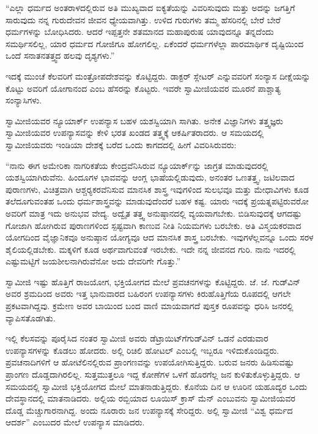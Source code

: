  “ಎಲ್ಲಾ ಧರ್ಮದ ಅಂತರಾಳದಲ್ಲಿರುವ ಅತಿ ಮುಖ್ಯವಾದ ಐಕ್ಯತೆಯನ್ನು ವಿವರಿಸುವುದು ಮತ್ತು ಅದನ್ನು ಜಗತ್ತಿಗೆ ಸಾರುವುದು ನನ್ನ ಗುರುದೇವನ ಜೀವನ ಧ್ಯೇಯವಾಗಿತ್ತು. ಉಳಿದ ಗುರುಗಳು ತಮ್ಮ ಹೆಸರಿನಲ್ಲಿ ಬೇರೆ ಬೇರೆ ಧರ್ಮಗಳನ್ನು ಬೋಧಿಸಿದರು. ಆದರೆ ಇಪ್ಪತ್ತನೇ ಶತಮಾನದ ಮಹಾಪುರುಷ ಯಾವುದನ್ನೂ ತನ್ನದೆಂದು ಸಮರ್ಥಿಸಲಿಲ್ಲ, ಯಾರ ಧರ್ಮದ ಗೋಜಿಗೂ ಹೋಗಲಿಲ್ಲ. ಏಕೆಂದರೆ ಧರ್ಮಗಳೆಲ್ಲಾ ಪಾರಮಾರ್ಥಿಕ ದೃಷ್ಟಿಯಿಂದ ಒಂದೆ ಸನಾತನತತ್ತ್ವದ ಹಲವು ದೃಶ್ಯಗಳು.” 

 ಇದಕ್ಕೆ ಮುಂಚೆ ಕೆಲವರಿಗೆ ಮಂತ್ರೋಪದೇಶವನ್ನು ಕೊಟ್ಟಿದ್ದರು. ಡಾಕ್ಟರ್ ಸ್ಲೇಟರ್ ಎನ್ನುವವರಿಗೆ ಸಂನ್ಯಾಸ ದೀಕ್ಷೆಯನ್ನು ಕೊಟ್ಟು ಅವರಿಗೆ ಯೋಗಾನಂದ ಎಂಬ ಹೆಸರನ್ನು ಕೊಟ್ಟರು. ಇವರೇ ಸ್ವಾಮೀಜಿಯವರ ಮೂರನೆ ಪಾಶ್ಚಾತ್ಯ ಸಂನ್ಯಾಸಿಗಳು. 

 ಸ್ವಾಮೀಜಿಯವರ ನ್ಯೂಯಾರ್ಕ್ ಉಪನ್ಯಾಸ ಬಹಳ ಯಶಸ್ವಿಯಾಗಿ ಸಾಗಿತು. ಅನೇಕ ವಿಜ್ಞಾನಿಗಳು ತತ್ತ್ವಜ್ಞರು ಸ್ವಾಮೀಜಿಯವರ ಉಪನ್ಯಾಸವನ್ನು ಕೇಳಿ ಭರತ ಖಂಡದ ತತ್ತ್ವಕ್ಕೆ ಆಕರ್ಷಿತರಾದರು. ಆ ಸಮಯದಲ್ಲಿ ಸ್ವಾಮೀಜಿಯವರು ಇಂಡಿಯಾ ದೇಶಕ್ಕೆ ಬರೆದ ಒಂದು ಕಾಗದದಲ್ಲಿ ಹೀಗೆ ವಿವರಿಸಿರುವರು: 

 “ನಾನು ಈಗ ಅಮೇರಿಕಾ ನಾಗರಿಕತೆಯ ಕೇಂದ್ರವೆನಿಸಿರುವ ನ್ಯೂಯಾರ್ಕ್‍ನ್ನು ಜಾಗ್ರತ ಮಾಡುವುದರಲ್ಲಿ ಯಶಸ್ವಿಯಾಗಿರುವೆನು. ಹಿಂದೂಗಳ ಭಾವವನ್ನು ಆಂಗ್ಲ ಭಾಷೆಯಲ್ಲಿಡುವುದು, ಅನಂತರ ಒಣತತ್ತ್ವ, ಜಟಿಲವಾದ ಪುರಾಣಗಳು, ವಿಚಿತ್ರವಾಗಿ ಆಶ್ಚರ‍್ಯಕರವೆನಿಸುವ ಮಾನಸಿಕ ಶಾಸ್ತ್ರ ಇವುಗಳಿಂದ ಸುಲಭವೂ ಮತ್ತು ಮೇಧಾವಿಗಳು ಕೂಡ ತಲೆದೂಗುವಂತಹ ಒಂದು ಧರ್ಮಶಾಸ್ತ್ರವನ್ನು ಮಾಡುವುದೆಂದರೆ ಬಹಳ ಕಷ್ಟ. ಯಾರು ಇದಕ್ಕೆ ಪ್ರಯತ್ನಪಟ್ಟಿರುವರೋ ಅವರಿಗೆ ಮಾತ್ರ ಇದು ಅನುಭವ ವೇದ್ಯ. ಅದ್ವೈತ ತತ್ತ್ವ ಅನುಷ್ಠಾನದಲ್ಲಿ ವ್ಯಯವಾಗಬೇಕು. ಬಿಡಿಸುವುದಕ್ಕೆ ಆಗದಷ್ಟು ಗೋಜಾಗಿ ಹೋಗಿರುವ ಪುರಾಣಗಳಿಂದ ಸ್ಪಷ್ಟವಾಗಿ ಕಾಣುವ ನೀತಿ ನಿಯಮಗಳು ಬರಬೇಕು. ಅತಿ ವಿಸ್ಮಯಕರವಾದ ಯೋಗದಿಂದ ವೈಜ್ಞಾನಿಕವೂ ಅನುಷ್ಠಾನ ಯೋಗ್ಯವೂ ಆದ ಮಾನಸಿಕ ಶಾಸ್ತ್ರ ಬರಬೇಕು. ಇವುಗಳೆಲ್ಲವನ್ನೂ ಒಂದು ಸರಳ ಶೈಲಿಯಲ್ಲಿಡಬೇಕು. ಮಕ್ಕಳಿಗೆ ಕೂಡ ಅರ್ಥವಾಗುವಂತೆ ಇರಬೇಕು. ಇದೇ ನನ್ನ ಜೀವನದ ಗುರಿ. ನಾನು ಇದರಲ್ಲಿ ಎಷ್ಟುಮಟ್ಟಿಗೆ ಜಯಶೀಲನಾಗಿರುವೆನೋ ಅದು ದೇವರಿಗೇ ಗೊತ್ತು.” 

 ಸ್ವಾಮೀಜಿ ಇಷ್ಟು ಹೊತ್ತಿಗೆ ರಾಜಯೋಗ, ಭಕ್ತಿಯೋಗದ ಮೇಲೆ ಪ್ರವಚನಗಳನ್ನು ಕೊಟ್ಟಿದ್ದರು. ಜೆ. ಜೆ. ಗುಡ್‍ವಿನ್ ಅವರ ಶ್ರಮದಿಂದ ಅವರು ಇತ್ತ ಭಾನುವಾರದ ಬಹಿರಂಗ ಉಪನ್ಯಾಸಗಳು ಕಿರುಹೊತ್ತಿಗೆಯ ರೂಪದಲ್ಲಿ ಆಗಲೇ ಪ್ರಕಟವಾಗಿದ್ದವು. ಕ್ರಮೇಣ ಅವರ ಬಾಯಿಂದ ಬಂದ ವಾಣಿ ಮಾಯವಾಗದೆ ಪುಸ್ತಕ ರೂಪವನ್ನು ಧರಿಸಿ ಜನರಲ್ಲಿ ವ್ಯಾಪಿಸತೊಡಗಿತು. 

 ಇಲ್ಲಿ ಕೆಲಸವನ್ನು ಪೂರೈಸಿದ ನಂತರ ಸ್ವಾಮೀಜಿ ಅವರು ಡೆಟ್ರಾಯಿಟ್‍ಗೆ\break ಗುಡ್‍ವಿನ್ ಒಡನೆ ಎರಡುವಾರ ಉಪನ್ಯಾಸಗಳನ್ನು ಕೊಡಲು ಹೋದರು. ಅಲ್ಲಿ ರಿಚಿಲಿ ಹೋಟಲ್ ಎಂಬಲ್ಲಿ ಇಬ್ಬರೂ ಇಳಿದುಕೊಂಡಿದ್ದರು. ಪ್ರವಚನಾದಿಗಳಿಗೆ ಆ ಹೋಟೆಲಿನಲ್ಲಿರುವ ಪ್ರಾಂಗಣವನ್ನು ಉಪಯೋಗಿಸುತ್ತಿದ್ದರು. ಬರುವ ಜನರು ಹಿಡಿಸುವಷ್ಟು ಪ್ರಾಂಗಣ ದೊಡ್ಡದಾಗಿರಲಿಲ್ಲ. ಸುತ್ತಮುತ್ತಲೂ ಇದ್ದ ಕೋಣೆಗಳ ಒಳಗೆ ಹೊರಗೆಲ್ಲ ಜನ ಕುಳಿತುಕೊಳ್ಳುತ್ತಿದ್ದರು. ಆ ಸಮಯದಲ್ಲಿ ಸ್ವಾಮೀಜಿ ಭಕ್ತಿಯೋಗದ ಮೇಲೆ ಮಾತನಾಡುತ್ತಿದ್ದರು. ಕೊನೆಯ ದಿನ ಆ ಊರಿನ ಯಹೂದ್ಯರ ಒಂದು ದೇವಸ್ಥಾನದಲ್ಲಿ ಮಾತನಾಡಿದರು. ಅಲ್ಲಿಯ ರಬ್ಬಿಯಾದ ಲೂಯಿಸ್ ಕ್ರಾಸ್ ಮೆನ್ ಎಂಬುವನು ಸ್ವಾಮೀಜಿಯವರ ದೊಡ್ಡ ಮೆಚ್ಚುಗಾರನಾಗಿದ್ದ. ಅಂದು ನೂರಾರು ಜನ ಉಪನ್ಯಾಸಕ್ಕೆ ಸೇರಿದ್ದರು. ಅಲ್ಲಿ ಸ್ವಾಮೀಜಿ “ವಿಶ್ವ ಧರ್ಮದ ಆದರ್ಶ” ಎಂಬುದರ ಮೇಲೆ ಉಪನ್ಯಾಸ ಮಾಡಿದರು. 

